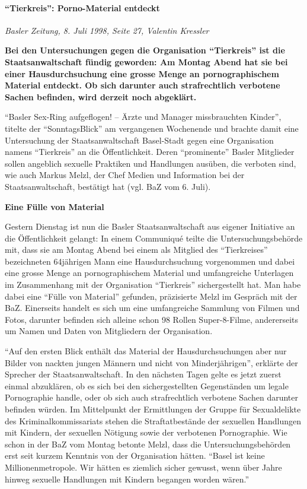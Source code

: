 \hypertarget{tierkreis-porno-material-entdeckt}{%
\paragraph{``Tierkreis'': Porno-Material
entdeckt}\label{tierkreis-porno-material-entdeckt}}

\emph{Basler Zeitung, 8. Juli 1998, Seite 27, Valentin Kressler}

\textbf{Bei den Untersuchungen gegen die Organisation ``Tierkreis'' ist
die Staatsanwaltschaft fündig geworden: Am Montag Abend hat sie bei
einer Hausdurchsuchung eine grosse Menge an pornographischem Material
entdeckt. Ob sich darunter auch strafrechtlich verbotene Sachen
befinden, wird derzeit noch abgeklärt.}

``Basler Sex-Ring aufgeflogen! -- Ärzte und Manager missbrauchten
Kinder'', titelte der ``SonntagsBlick'' am vergangenen Wochenende und
brachte damit eine Untersuchung der Staatsanwaltschaft Basel-Stadt gegen
eine Organisation namens ``Tierkreis'' an die Öffentlichkeit. Deren
``prominente'' Basler Mitglieder sollen angeblich sexuelle Praktiken und
Handlungen ausüben, die verboten sind, wie auch Markus Melzl, der Chef
Medien und Information bei der Staatsanwaltschaft, bestätigt hat (vgl.
BaZ vom 6. Juli).

\textbf{Eine Fülle von Material}

Gestern Dienstag ist nun die Basler Staatsanwaltschaft aus eigener
Initiative an die Öffentlichkeit gelangt: In einem Communiqué teilte die
Untersuchungsbehörde mit, dass sie am Montag Abend bei einem als
Mitglied des ``Tierkreises'' bezeichneten 64jährigen Mann eine
Hausdurchsuchung vorgenommen und dabei eine grosse Menge an
pornographischem Material und umfangreiche Unterlagen im Zusammenhang
mit der Organisation ``Tierkreis'' sichergestellt hat. Man habe dabei
eine ``Fülle von Material'' gefunden, präzisierte Melzl im Gespräch mit
der BaZ. Einerseits handelt es sich um eine umfangreiche Sammlung von
Filmen und Fotos, darunter befinden sich alleine schon 98 Rollen
Super-8-Filme, andererseits um Namen und Daten von Mitgliedern der
Organisation.

``Auf den ersten Blick enthält das Material der Hausdurchsuchungen aber
nur Bilder von nackten jungen Männern und nicht von Minderjährigen'',
erklärte der Sprecher der Staatsanwaltschaft. In den nächsten Tagen
gelte es jetzt zuerst einmal abzuklären, ob es sich bei den
sichergestellten Gegenständen um legale Pornographie handle, oder ob
sich auch strafrechtlich verbotene Sachen darunter befinden würden. Im
Mittelpunkt der Ermittlungen der Gruppe für Sexualdelikte des
Kriminalkommissariats stehen die Straftatbestände der sexuellen
Handlungen mit Kindern, der sexuellen Nötigung sowie der verbotenen
Pornographie. Wie schon in der BaZ vom Montag betonte Melzl, dass die
Untersuchungsbehörden erst seit kurzem Kenntnis von der Organisation
hätten. ``Basel ist keine Millionenmetropole. Wir hätten es ziemlich
sicher gewusst, wenn über Jahre hinweg sexuelle Handlungen mit Kindern
begangen worden wären.''

